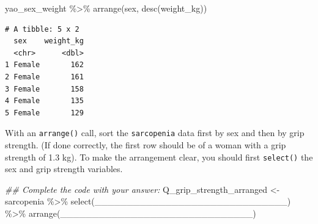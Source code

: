 \documentclass[
  letterpaper,
  DIV=11,
  numbers=noendperiod]{scrreprt}
\newenvironment{Shaded}{\begin{snugshade}}{\end{snugshade}}
\newcommand{\DocumentationTok}[1]{\textcolor[rgb]{0.37,0.37,0.37}{\textit{#1}}}
\newcommand{\FunctionTok}[1]{\textcolor[rgb]{0.28,0.35,0.67}{#1}}
\newcommand{\NormalTok}[1]{\textcolor[rgb]{0.00,0.23,0.31}{#1}}
\newcommand{\OtherTok}[1]{\textcolor[rgb]{0.00,0.23,0.31}{#1}}
\newcommand{\SpecialCharTok}[1]{\textcolor[rgb]{0.37,0.37,0.37}{#1}}
\begin{document}
\begin{Shaded}
\begin{Highlighting}[]
\NormalTok{yao\_sex\_weight }\SpecialCharTok{\%\textgreater{}\%} 
  \FunctionTok{arrange}\NormalTok{(sex, }\FunctionTok{desc}\NormalTok{(weight\_kg))}
\end{Highlighting}
\end{Shaded}

\begin{verbatim}
# A tibble: 5 x 2
  sex    weight_kg
  <chr>      <dbl>
1 Female       162
2 Female       161
3 Female       158
4 Female       135
5 Female       129
\end{verbatim}

\begin{tcolorbox}[enhanced jigsaw, title=\textcolor{quarto-callout-tip-color}{\faLightbulb}\hspace{0.5em}{Practice}, colbacktitle=quarto-callout-tip-color!10!white, leftrule=.75mm, arc=.35mm, opacityback=0, bottomrule=.15mm, rightrule=.15mm, toptitle=1mm, breakable, toprule=.15mm, colback=white, coltitle=black, colframe=quarto-callout-tip-color-frame, bottomtitle=1mm, titlerule=0mm, left=2mm, opacitybacktitle=0.6]

With an \texttt{arrange()} call, sort the \texttt{sarcopenia} data first
by sex and then by grip strength. (If done correctly, the first row
should be of a woman with a grip strength of 1.3 kg). To make the
arrangement clear, you should first \texttt{select()} the sex and grip
strength variables.

\begin{Shaded}
\begin{Highlighting}[]
\DocumentationTok{\#\# Complete the code with your answer:}
\NormalTok{Q\_grip\_strength\_arranged }\OtherTok{\textless{}{-}} 
\NormalTok{  sarcopenia }\SpecialCharTok{\%\textgreater{}\%} 
  \FunctionTok{select}\NormalTok{(\_\_\_\_\_\_\_\_\_\_\_\_\_\_\_\_\_\_\_\_\_\_\_\_\_\_\_\_\_\_) }\SpecialCharTok{\%\textgreater{}\%} 
  \FunctionTok{arrange}\NormalTok{(\_\_\_\_\_\_\_\_\_\_\_\_\_\_\_\_\_\_\_\_\_\_\_\_\_\_\_\_\_\_)}
\end{Highlighting}
\end{Shaded}

\end{tcolorbox}
\end{document}
